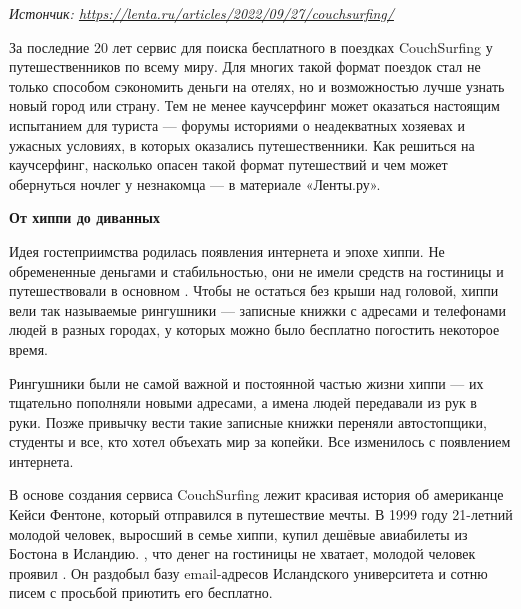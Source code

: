 \textit{Истончик: \url{https://lenta.ru/articles/2022/09/27/couchsurfing/}}

За последние 20 лет сервис для поиска бесплатного  в поездках CouchSurfing  у путешественников по всему миру. Для многих такой формат поездок стал не только способом сэкономить  деньги на отелях, но и возможностью лучше узнать новый город или страну. Тем не менее каучсерфинг может оказаться настоящим испытанием для  туриста — форумы  историями о неадекватных хозяевах и ужасных условиях, в которых оказались путешественники. Как решиться на каучсерфинг, насколько опасен такой формат путешествий и чем может обернуться ночлег у незнакомца — в материале «Ленты.ру».

\textbf{От хиппи до диванных }

Идея  гостеприимства родилась  появления интернета и  эпохе хиппи. Не обремененные деньгами и стабильностью, они не имели средств на гостиницы и путешествовали в основном . Чтобы не остаться без крыши над головой, хиппи вели так называемые рингушники — записные книжки с адресами и телефонами людей в разных городах, у которых можно было бесплатно погостить некоторое время.

Рингушники были  не самой важной и постоянной частью жизни хиппи — их тщательно пополняли новыми адресами, а имена  людей передавали из рук в руки. Позже привычку вести такие записные книжки переняли автостопщики, студенты и все, кто хотел объехать мир за копейки. Все изменилось с появлением интернета.

В основе создания сервиса CouchSurfing лежит красивая история об американце Кейси Фентоне, который отправился в путешествие мечты. В 1999 году 21-летний молодой человек, выросший в семье хиппи, купил дешёвые авиабилеты из Бостона в Исландию. , что денег на гостиницы не хватает, молодой человек проявил . Он раздобыл базу email-адресов Исландского университета и  сотню писем с просьбой приютить его бесплатно.

